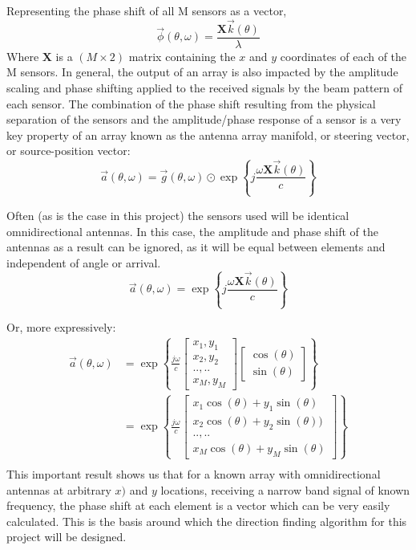 Representing the phase shift of all M sensors as a vector,
\begin{equation}
  \vec{\phi}(\theta, \omega) = \frac{\mathbf{X}\vec{k}(\theta)}{\lambda}
\end{equation}
Where \(\mathbf{X}\) is a \((M \times 2)\) matrix containing the \(x\) and \(y\) coordinates of each of the M sensors. 
In general, the output of an array is also impacted by the amplitude scaling and phase shifting applied to the received signals by the beam pattern of each sensor. The combination of the phase shift resulting from the physical separation of the sensors and the amplitude/phase response of a sensor is a very key property of an array known as the antenna array manifold, or steering vector, or source-position vector:
\begin{equation}
  \boxed{
    \vec{a}(\theta, \omega) = \vec{g}(\theta, \omega) \odot \exp \left\{ j \frac{\omega \mathbf{X} \vec{k}(\theta)}{c} \right\}
  }
\end{equation}

Often (as is the case in this project) the sensors used will be identical omnidirectional antennas. In this case, the amplitude and phase shift of the antennas as a result can be ignored, as it will be equal between elements and independent of angle or arrival. 
\begin{equation}
  \vec{a}(\theta, \omega) = \exp \left\{ j \frac{\omega \mathbf{X} \vec{k}(\theta)}{c} \right\}
\end{equation}

Or, more expressively:
\begin{align}
\vec{a}(\theta, \omega) &= \exp \left\{ \frac{j \omega}{c} \begin{bmatrix} x_1, y_1 \\ x_2, y_2 \\ .., .. \\ x_M, y_M \end{bmatrix} \begin{bmatrix} \cos(\theta) \\ \sin(\theta) \end{bmatrix} \right\} \\
                        &= \exp \left\{ \frac{j \omega}{c} \begin{bmatrix} x_1\cos(\theta) + y_1\sin(\theta) \\ x_2\cos(\theta) + y_2\sin(\theta)) \\ .., .. \\ x_M\cos(\theta) + y_M\sin(\theta) \end{bmatrix} \right\} \\
\end{align}
This important result shows us that for a known array with omnidirectional antennas at arbitrary \(x)\) and \(y\) locations, receiving a narrow band signal of known frequency, the phase shift at each element is a vector which can be very easily calculated. This is the basis around which the direction finding algorithm for this project will be designed. 

